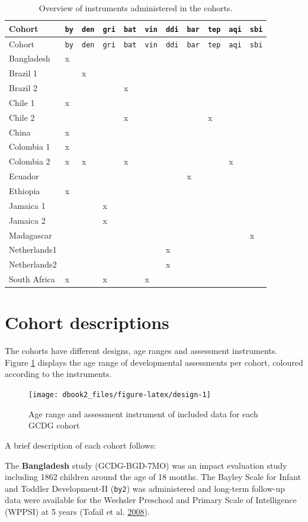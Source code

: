 \documentclass[
]{book}
\begin{document}
\begin{longtable}[]{@{}lllllllllll@{}}
\caption{\label{tab:cohorts} Overview of instruments administered in the cohorts.}\tabularnewline
\toprule
Cohort & \texttt{by} & \texttt{den} & \texttt{gri} & \texttt{bat} & \texttt{vin} & \texttt{ddi} & \texttt{bar} & \texttt{tep} & \texttt{aqi} & \texttt{sbi}\tabularnewline
\midrule
\endfirsthead
\toprule
Cohort & \texttt{by} & \texttt{den} & \texttt{gri} & \texttt{bat} & \texttt{vin} & \texttt{ddi} & \texttt{bar} & \texttt{tep} & \texttt{aqi} & \texttt{sbi}\tabularnewline
\midrule
\endhead
Bangladesh & x & & & & & & & & &\tabularnewline
Brazil 1 & & x & & & & & & & &\tabularnewline
Brazil 2 & & & & x & & & & & &\tabularnewline
Chile 1 & x & & & & & & & & &\tabularnewline
Chile 2 & & & & x & & & & x & &\tabularnewline
China & x & & & & & & & & &\tabularnewline
Colombia 1 & x & & & & & & & & &\tabularnewline
Colombia 2 & x & x & & x & & & & & x &\tabularnewline
Ecuador & & & & & & & x & & &\tabularnewline
Ethiopia & x & & & & & & & & &\tabularnewline
Jamaica 1 & & & x & & & & & & &\tabularnewline
Jamaica 2 & & & x & & & & & & &\tabularnewline
Madagascar & & & & & & & & & & x\tabularnewline
Netherlands1 & & & & & & x & & & &\tabularnewline
Netherlands2 & & & & & & x & & & &\tabularnewline
South Africa & x & & x & & x & & & & &\tabularnewline
\bottomrule
\end{longtable}

\hypertarget{sec:cohorts}{%
\section{Cohort descriptions}\label{sec:cohorts}}

The cohorts have different designs, age ranges and assessment instruments. Figure \ref{fig:design} displays the age range of developmental assessments per cohort, coloured according to the instruments.

\begin{figure}

{\centering \texttt{[image: dbook2\_files/figure-latex/design-1]} 

}

\caption{Age range and assessment instrument of included data for each GCDG cohort}\label{fig:design}
\end{figure}



A brief description of each cohort follows:

The \textbf{Bangladesh} study (GCDG-BGD-7MO) was an impact evaluation study including 1862 children around the age of 18 months. The Bayley Scale for Infant and Toddler Development-II (\texttt{by2}) was administered and long-term follow-up data were available for the Wechsler Preschool and Primary Scale of Intelligence (WPPSI) at 5 years (Tofail et al. \protect\hyperlink{ref-Tofail2008}{2008}).
\end{document}
